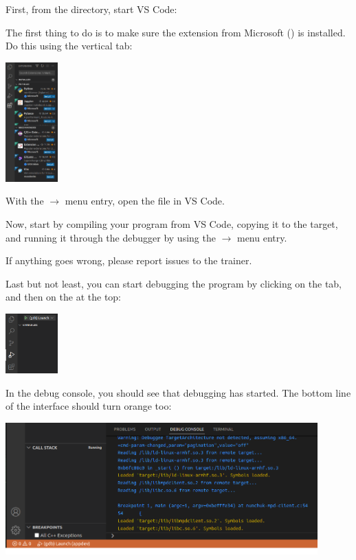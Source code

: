 First, from the  directory, start VS Code:


The first thing to do is to make sure the  extension from Microsoft
() is installed. Do this using the
 vertical tab:

\includegraphics[width=2cm]{labs/sysdev-application-development-and-debugging/vscode-extensions-tab.png}

With the  $\rightarrow$  menu entry, open the
 file in VS Code.

Now, start by compiling your program from VS Code, copying it to the
target, and running it through the debugger by using the
 $\rightarrow$  menu entry.

If anything goes wrong, please report issues to the trainer.

Last but not least, you can start debugging the program by clicking on
the  tab, and then on the  at the
top:

\includegraphics[width=2cm]{labs/sysdev-application-development-and-debugging/vscode-run-debug-tab.png}

In the debug console, you should see that debugging has started. The
bottom line of the interface should turn orange too:

\includegraphics[width=12cm]{labs/sysdev-application-development-and-debugging/vscode-debugging-started.png}

